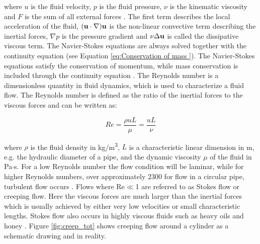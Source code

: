 where $u$ is the fluid velocity, $p$ is the fluid pressure, $\nu$ is the kinematic viscosity and $F$ is the sum of all external forces \cite{versteeg2007introduction}. The first term describes the local acceleration of the fluid, $({\bf u} \cdot \nabla) {\bf u}$ is the non-linear convective term describing the inertial forces, $\nabla p$ is the pressure gradient and $\nu\Delta{\bf u}$ is called the dissipative viscous term. The Navier-Stokes equations are always solved together with the continuity equation (see Equation \ref{eq:Conservation of mass }). The Navier-Stokes equations satisfy the conservation of momentum, while mass conservation is included through the continuity equation \cite{alkahtani2013numerical}. The Reynolds number is a dimensionless quantity in fluid dynamics, which is used to characterize a fluid flow. The Reynolds number is defined as the ratio of the inertial forces to the viscous forces and can be written as:  

\begin{equation}
Re=\frac{\rho u L}{\mu}=\frac{uL}{\nu}
\label{eq:Reynolds}
\end{equation}

where $\rho$ is the fluid density in kg/m\textsuperscript{3}, $L$ is a characteristic linear dimension in m, e.g. the hydraulic diameter of a pipe, and the dynamic viscosity $\mu$ of the fluid in Pa$\cdotp$s. For a low Reynolds number the flow condition will be laminar, while for higher Reynolds numbers, over approximately 2300 for flow in a circular pipe, turbulent flow occurs \cite{schwarze2012cfd}. Flows where Re$\ll$1 are referred to as Stokes flow or creeping flow. Here the viscous forces are much larger than the inertial forces which is usually achieved by either very low velocities or small characteristic lengths. Stokes flow also occurs in highly viscous fluids such as heavy oils and honey \cite{lautrup2004physics}. Figure \ref{fig:creep_tot} shows creeping flow around a cylinder as a schematic drawing and in reality. 

